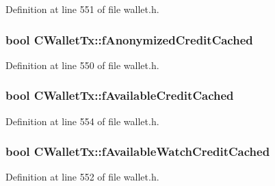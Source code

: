 Definition at line 551 of file wallet.\+h.

\hypertarget{class_c_wallet_tx_acec9ac9932baf1ca07e5b270f50d8f7e}{}
\subsubsection[{f\+Anonymized\+Credit\+Cached}]{\setlength{\rightskip}{0pt plus 5cm}bool C\+Wallet\+Tx\+::f\+Anonymized\+Credit\+Cached\hspace{0.3cm}{\ttfamily [mutable]}}\label{class_c_wallet_tx_acec9ac9932baf1ca07e5b270f50d8f7e}


Definition at line 550 of file wallet.\+h.

\hypertarget{class_c_wallet_tx_ac059d14ddf84de69430c57a12573b412}{}
\subsubsection[{f\+Available\+Credit\+Cached}]{\setlength{\rightskip}{0pt plus 5cm}bool C\+Wallet\+Tx\+::f\+Available\+Credit\+Cached\hspace{0.3cm}{\ttfamily [mutable]}}\label{class_c_wallet_tx_ac059d14ddf84de69430c57a12573b412}


Definition at line 554 of file wallet.\+h.

\hypertarget{class_c_wallet_tx_a5f15653f1307c561520a4fa26a12db33}{}
\subsubsection[{f\+Available\+Watch\+Credit\+Cached}]{\setlength{\rightskip}{0pt plus 5cm}bool C\+Wallet\+Tx\+::f\+Available\+Watch\+Credit\+Cached\hspace{0.3cm}{\ttfamily [mutable]}}\label{class_c_wallet_tx_a5f15653f1307c561520a4fa26a12db33}


Definition at line 552 of file wallet.\+h.

\hypertarget{class_c_wallet_tx_ab436a962e5e32d392928bc68af968bf1}{}
